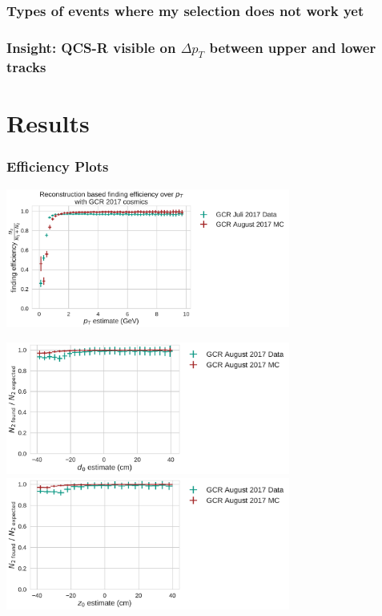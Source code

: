\documentclass[18pt]{beamer}
\begin{document}
\begin{frame}
  \frametitle{Types of events where my selection does not work yet}
  
\end{frame}

\begin{frame}
  \frametitle{Insight: QCS-R visible on $\Delta p_T$ between upper and lower tracks}
\end{frame}

\section{Results}
\begin{frame}
  \frametitle{Efficiency Plots}
  \includegraphics[width=0.7\textwidth]{figures/efficiency_study/cosmicbased_findeff_over_pt.pdf}
\end{frame}

\begin{frame}
    \includegraphics[width=0.7\textwidth]{figures/efficiency_study/cosmicbased_findeff_over_d0.pdf}\\
    \includegraphics[width=0.7\textwidth]{figures/efficiency_study/cosmicbased_findeff_over_z0.pdf}
  \end{frame}
\end{document}
